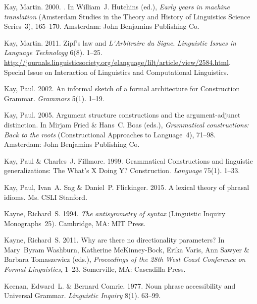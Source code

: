 \begin{thebibliography}{1420}
Kay, Martin. 2000.
.
\newblock In William~J. Hutchins (ed.), \emph{Early years in machine
  translation} (Amsterdam Studies in the Theory and History of Linguistics
  Science Series~3), 165--170. Amsterdam: John Benjamins Publishing Co.

Kay, Martin. 2011.
\newblock Zipf's law and \emph{L'Arbitraire du Signe}.
\newblock \emph{Linguistic Issues in Language Technology} 6(8). 1--25.
\newblock
  \urlprefix\url{http://journals.linguisticsociety.org/elanguage/lilt/article/view/2584.html}.
\newblock Special Issue on Interaction of Linguistics and Computational
  Linguistics.

Kay, Paul. 2002.
\newblock An informal sketch of a formal architecture for {Construction
  Grammar}.
\newblock \emph{Grammars} 5(1). 1--19.

Kay, Paul. 2005.
\newblock Argument structure constructions and the argument-adjunct
  distinction.
\newblock In Mirjam Fried \& Hans~C. Boas (eds.), \emph{Grammatical
  constructions: {Back} to the roots} (Constructional Approaches to
  Language~4), 71--98. Amsterdam: John Benjamins Publishing Co.

Kay, Paul \& Charles~J. Fillmore. 1999.
\newblock Grammatical {Constructions} and linguistic generalizations: {The}
  {What's X Doing Y? Construction}.
\newblock \emph{Language} 75(1). 1--33.

Kay, Paul, Ivan~A. Sag \& Daniel~P. Flickinger. 2015.
\newblock A lexical theory of phrasal idioms.
\newblock Ms. CSLI Stanford.

Kayne, Richard~S. 1994.
\newblock \emph{The antisymmetry of syntax} (Linguistic Inquiry Monographs~25).
\newblock Cambridge, MA: MIT Press.

Kayne, Richard~S. 2011.
\newblock Why are there no directionality parameters?
\newblock In Mary~Byram Washburn, Katherine McKinney-Bock, Erika Varis, Ann
  Sawyer \& Barbara Tomaszewicz (eds.), \emph{Proceedings of the {28th West
  Coast Conference on Formal Linguistics}}, 1--23. Somerville, MA: Cascadilla
  Press.

Keenan, Edward~L. \& Bernard Comrie. 1977.
\newblock Noun phrase accessibility and {Universal Grammar}.
\newblock \emph{Linguistic Inquiry} 8(1). 63--99.


\end{thebibliography}

